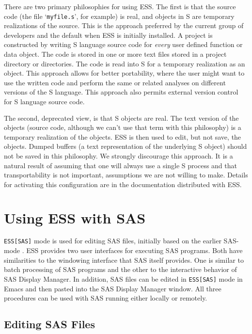 \documentclass{article}
\newcommand{\stexttt}[1]{{\small\texttt{#1}}}
\newcommand{\ssf}[1]{{\small\sf{#1}}}
\newcommand{\file}[1]{`\stexttt{#1}'}
\begin{document}
There are two primary philosophies for using ESS.  The first is that the
source code (the file \file{myfile.s}, for example) is real, and objects
in S are temporary realizations of the source.  This is the approach
preferred by the current group of developers and the default when ESS is
initially installed.  A project is constructed by writing S language
source code for \emph{every} user defined function or data object.  The
code is stored in one or more text files stored in a project directory
or directories.  The code is read into S for a temporary realization as
an object.  This approach allows for better portability, where the user
might want to use the written code and perform the same or related
analyses on different versions of the S language.  This approach also
permits external version control for S language source code.

The second, deprecated view, is that S objects are real.  The text
version of the objects (source code, although we can't use that term
with this philosophy) is a temporary realization of the objects.  ESS
is then used to edit, but not save, the objects.  Dumped buffers (a
text representation of the underlying S object) should not be saved in
this philosophy.  We strongly discourage this approach.  It is a
natural result of assuming that one will always use a single S process
and that transportability is not important, assumptions we are not
willing to make.  Details for activating this configuration are in the
documentation distributed with ESS.

\section{Using ESS with SAS}
\label{sec:SAS}

\stexttt{ESS[SAS]} mode is used for editing SAS files, initially based
on the earlier SAS-mode \citep{SASMODE}.  ESS provides two user
interfaces for executing SAS programs.  Both have similarities to the
windowing interface that SAS itself provides.  One is similar to batch
processing of SAS programs and the other to the interactive behavior
of SAS Display Manager.  In addition, SAS files can be edited in
\stexttt{ESS[SAS]} mode in Emacs and then pasted into the SAS Display
Manager \ssf{Program Editor} window.  All three procedures can be used
with SAS running either locally or remotely.

\subsection{Editing SAS Files}
\label{sec:SAS:edit}
\end{document}
